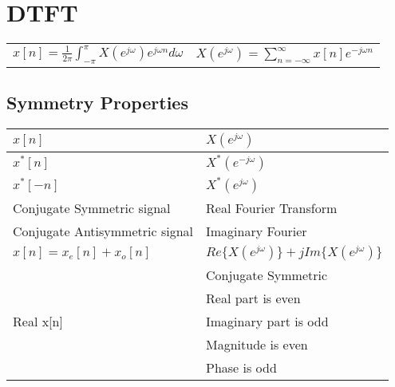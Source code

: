 \documentclass{article}
\begin{document}
\section*{DTFT}
\begin{center}
    \begin{tabularx}{\textwidth - 1in}{XX}
        $x[n] = \frac{1}{2\pi}\int_{-\pi}^{\pi}{X(e^{j\omega})e^{j\omega n}d\omega}$ & $X(e^{j\omega}) = \sum_{n=-\infty}^{\infty}{x[n]e^{-j\omega n}}$
    \end{tabularx}
\end{center}
\subsection*{Symmetry Properties}
\begin{center}
    \begin{tabularx}{\textwidth}{XX}
        \hline
        $x[n]$ & $X(e^{j\omega})$\\
        \hline
        $x^*[n]$ & $X^*(e^{-j\omega})$\\
        $x^*[-n]$ & $X^*(e^{j\omega})$\\
        Conjugate Symmetric signal & Real Fourier Transform\\
        Conjugate Antisymmetric signal & Imaginary Fourier\\
        $x[n]=x_e[n]+x_o[n]$ & $Re\{X(e^{j\omega})\}+jIm\{X(e^{j\omega})\}$\\
        \hline
         & Conjugate Symmetric\\
         & Real part is even\\
         Real x[n] & Imaginary part is odd\\
         & Magnitude is even\\
         & Phase is odd\\
    \end{tabularx}
\end{center}
\end{document}
